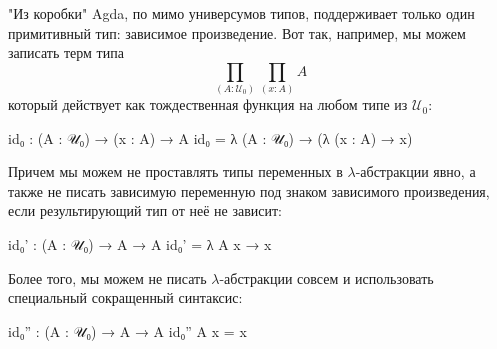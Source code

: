 \documentclass{article}[12pt]
\begin{document}
"Из коробки" \; Agda, по мимо универсумов типов, поддерживает только один примитивный тип: зависимое
произведение. Вот так, например, мы можем записать терм типа 
$$\prod_{(A : \mathcal U_0)} \prod_{(x : A)} A$$
который действует как тождественная функция на любом типе из $\mathcal U_0$:
\begin{code}
id₀ : (A : 𝒰₀) → (x : A) → A
id₀ = λ (A : 𝒰₀) → (λ (x : A) → x)
\end{code}
Причем мы можем не проставлять типы переменных в $\lambda$-абстракции явно, а также не писать зависимую
переменную под знаком зависимого произведения, если результирующий тип от неё не зависит:
\begin{code}
id₀' : (A : 𝒰₀) → A → A
id₀' = λ A x → x
\end{code}
Более того, мы можем не писать $\lambda$-абстракции совсем и использовать специальный сокращенный
синтаксис:
\begin{code}
id₀'' : (A : 𝒰₀) → A → A
id₀'' A x = x
\end{code}
\end{document}
